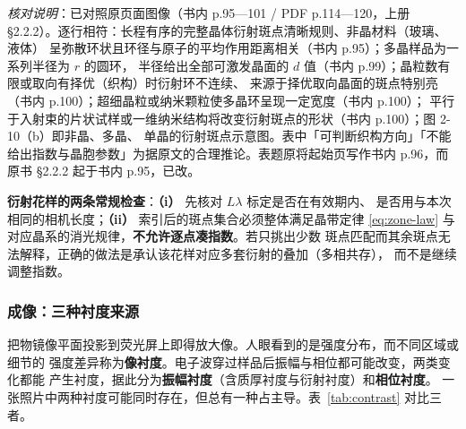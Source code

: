 \emph{核对说明}：已对照原页面图像（书内 p.95—101 / PDF p.114—120，上册 
§2.2.2）。逐行相符：长程有序的完整晶体衍射斑点清晰规则、非晶材料（玻璃、液体）
呈弥散环状且环径与原子的平均作用距离相关（书内 p.95）；多晶样品为一系列半径为 $r$ 的圆环，
半径给出全部可激发晶面的 $d$ 值（书内 p.99）；晶粒数有限或取向有择优（织构）时衍射环不连续、
来源于择优取向晶面的斑点特别亮（书内 p.100）；超细晶粒或纳米颗粒使多晶环呈现一定宽度（书内 p.100）；
平行于入射束的片状试样或一维纳米结构将改变衍射斑点的形状（书内 p.100）；图 2-10（b）即非晶、多晶、
单晶的衍射斑点示意图。表中「可判断织构方向」「不能给出指数与晶胞参数」为据原文的合理推论。表题原将起始页写作书内 
p.96，而原书 §2.2.2 起于书内 p.95，已改。


\begin{measure}
\textbf{衍射花样的两条常规检查}：\textbf{（i）} 先核对 $L\lambda$ 标定是否在有效期内、
是否用与本次相同的相机长度；\textbf{（ii）} 索引后的斑点集合必须整体满足晶带定律
\eqref{eq:zone-law} 与对应晶系的消光规律，\textbf{不允许逐点凑指数}。若只挑出少数
斑点匹配而其余斑点无法解释，正确的做法是承认该花样对应多套衍射的叠加（多相共存），
而不是继续调整指数。
\end{measure}

\subsubsection{成像：三种衬度来源}

把物镜像平面投影到荧光屏上即得放大像。人眼看到的是强度分布，而不同区域或细节的
强度差异称为\textbf{像衬度}。电子波穿过样品后振幅与相位都可能改变，两类变化都能
产生衬度，据此分为\textbf{振幅衬度}（含质厚衬度与衍射衬度）和\textbf{相位衬度}。
一张照片中两种衬度可能同时存在，但总有一种占主导。表~\ref{tab:contrast} 对比三者。

